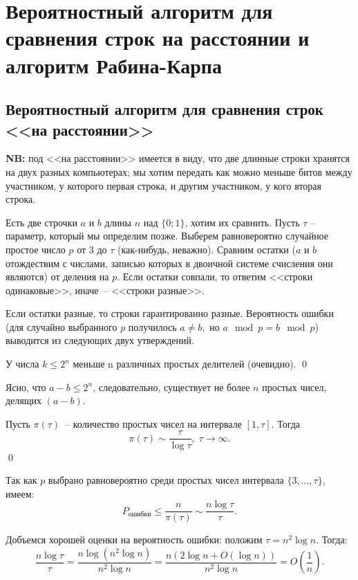 \section{Вероятностный алгоритм для сравнения строк на расстоянии и алгоритм Рабина-Карпа}

\secauthor{\ivan, \denis}
\subsection{Вероятностный алгоритм для сравнения строк <<на расстоянии>>}

\textbf{NB: }под <<на расстоянии>> имеется в виду, что две длинные строки хранятся на двух разных компьютерах; мы хотим передать как можно меньше битов между участником, у которого первая строка, и другим участником, у кого вторая строка.

Есть две строчки $a$ и $b$ длины $n$ над $\{0;1\}$, хотим их сравнить. Пусть $\tau$ -- параметр, который мы определим позже. Выберем равновероятно случайное простое число $p$ от 3 до $\tau$ (как-нибудь, неважно). Сравним остатки ($a$ и $b$ отождествим с числами, записью которых в двоичной системе счисления они являются) от деления на $p$. Если остатки совпали, то ответим <<строки одинаковые>>, иначе~-- <<строки разные>>.

Если остатки разные, то строки гарантированно разные. Вероятность ошибки (для случайно выбранного $p$ получилось $a\neq b,$ но $a\mod{p}=b\mod{p}$) выводится из следующих двух утверждений.

\begin{lemma*}
У числа $k\le 2^n$ меньше n различных простых делителей (очевидно). \qed
\end{lemma*}

Ясно, что $a-b\le 2^n$, следовательно, существует не более $n$ простых чисел, делящих $(a-b)$.

\begin{theorem*}
Пусть $\pi(\tau)$~-- количество простых чисел на интервале $[1, \tau]$. Тогда
$$\pi(\tau) \sim \frac{\tau}{\log\tau}, \; \tau\rightarrow\infty.$$ \qed
\end{theorem*}

Так как $p$ выбрано равновероятно среди простых чисел интервала $\{3, \ldots, \tau\}$, имеем: $$P_{\text{ошибки}}\le\frac{n}{\pi(\tau)} \sim \frac{n\log\tau}{\tau}.$$

Добъемся хорошей оценки на вероятность ошибки: положим $\tau = n^2 \log n$. Тогда:
$$\frac{n\log\tau}{\tau} = \frac{n\log(n^2\log n)}{n^2\log n} = \frac{n(2\log n + O(\log n))}{n^2\log n} = O\left(\frac{1}{n}\right).$$

